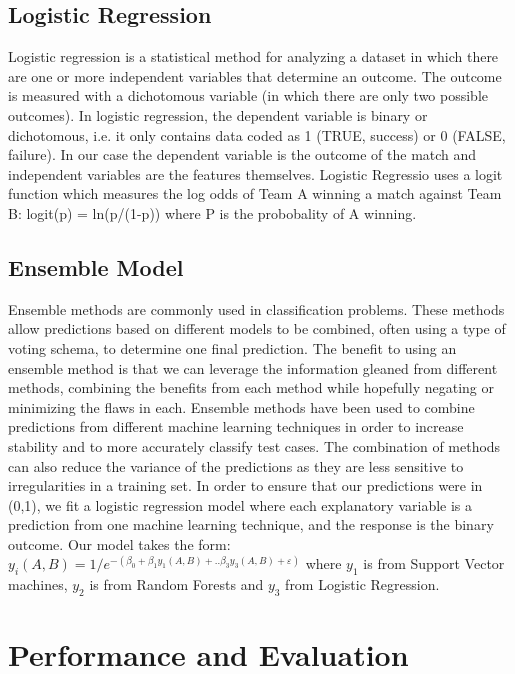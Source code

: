 \documentclass{article}
\begin{document}
\begin{multicols}{2}
	\subsection{Logistic Regression}
	 Logistic regression is a statistical method for analyzing a dataset in which there are one or more independent variables that determine an outcome. The outcome is measured with a dichotomous variable (in which there are only two possible outcomes). In logistic regression, the dependent variable is binary or dichotomous, i.e. it only contains data coded as 1 (TRUE, success) or 0 (FALSE, failure). In our case the dependent variable is the outcome of the match and independent variables are the features themselves. Logistic Regressio uses a logit function which measures the log odds of Team A winning a match against Team B: logit(p) = ln(p/(1-p)) where P is the probobality of A winning. 
	 
	 \subsection{Ensemble Model}
	 Ensemble methods are commonly used in classification problems. These methods allow predictions based on different models to be combined, often using a type of voting schema, to determine one final prediction. The benefit to using an ensemble method is that we can
leverage the information gleaned from different methods, combining the benefits from each method while hopefully negating or minimizing the flaws in each. Ensemble methods have been used to combine predictions from different machine learning techniques in order to increase stability and to more accurately classify test cases. The combination of methods can also reduce the variance of the predictions as they are less sensitive to irregularities in a training set.\cite{4}
	In order to ensure that our predictions were in (0,1), we fit a logistic regression model where each explanatory variable is a prediction from one machine learning technique, and the response is the binary outcome.
Our model takes the form:
\linebreak
\linebreak
$y_i(A,B) = 1/e^{-(\beta_0 + \beta_1y_1(A,B) +..\beta_3y_3(A,B) + \varepsilon )}$
where $y_1$ is from Support Vector machines, $y_2$ is from Random Forests and $y_3$ from Logistic Regression.

	\section{Performance and Evaluation}

\end{multicols}
\end{document}
